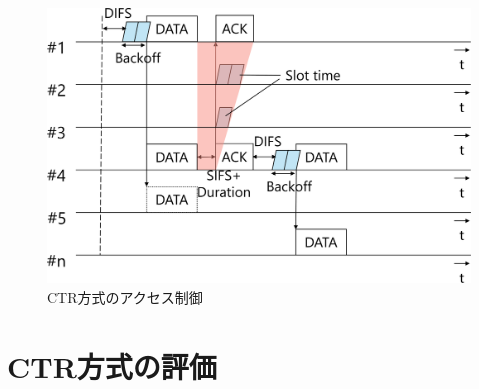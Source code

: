 \documentclass[a4paper,10pt]{ltjsarticle}
\begin{document}
\begin{figure}[H]
  \centering
  \includegraphics[width=\linewidth]{CTR_accsess.pdf} 
  \caption{CTR方式のアクセス制御}

\end{figure}
\section{CTR方式の評価}
\end{document}
